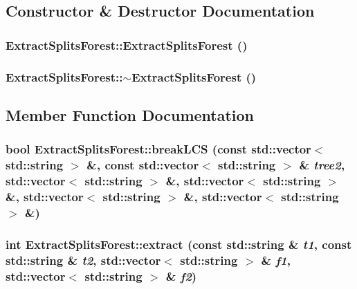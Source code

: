 \subsection{Constructor \& Destructor Documentation}
\subsubsection{\setlength{\rightskip}{0pt plus 5cm}Extract\-Splits\-Forest::Extract\-Splits\-Forest ()}\label{classExtractSplitsForest_a0}


\subsubsection{\setlength{\rightskip}{0pt plus 5cm}Extract\-Splits\-Forest::$\sim${\bf Extract\-Splits\-Forest} ()}\label{classExtractSplitsForest_a1}




\subsection{Member Function Documentation}
\subsubsection{\setlength{\rightskip}{0pt plus 5cm}bool Extract\-Splits\-Forest::break\-LCS (const std::vector$<$ std::string $>$ \&, const std::vector$<$ std::string $>$ \& {\em tree2}, std::vector$<$ std::string $>$ \&, std::vector$<$ std::string $>$ \&, std::vector$<$ std::string $>$ \&, std::vector$<$ std::string $>$ \&)\hspace{0.3cm}{\tt  [protected]}}\label{classExtractSplitsForest_b1}


\subsubsection{\setlength{\rightskip}{0pt plus 5cm}int Extract\-Splits\-Forest::extract (const std::string \& {\em t1}, const std::string \& {\em t2}, std::vector$<$ std::string $>$ \& {\em f1}, std::vector$<$ std::string $>$ \& {\em f2})}\label{classExtractSplitsForest_a2}


